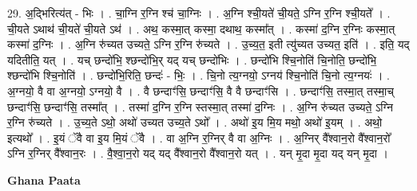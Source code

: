 \documentclass[17pt]{extarticle}
\begin{document}
29. अ॒द्भिरित्य॑त् - भिः । . चा॒ग्नि र॒ग्नि श्च॑ चा॒ग्निः । . अ॒ग्नि श्ची॒यते॑ ची॒यते॒ ऽग्नि र॒ग्नि श्ची॒यते᳚ । . ची॒यते ऽथाथ॑ ची॒यते॑ ची॒यते ऽथ॑ । . अथ॒ कस्मा॒त् कस्मा॒ दथाथ॒ कस्मा᳚त् । . कस्मा॑ द॒ग्नि र॒ग्निः कस्मा॒त् कस्मा॑ द॒ग्निः । . अ॒ग्नि रु॑च्यत उच्यते॒ ऽग्नि र॒ग्नि रु॑च्यते । . उ॒च्य॒त॒ इती त्यु॑च्यत उच्यत॒ इति॑ । . इति॒ यद् यदितीति॒ यत् । . यच् छन्दो॑भि॒ श्छन्दो॑भि॒र् यद् यच् छन्दो॑भिः । . छन्दो॑भि श्चि॒नोति॑ चि॒नोति॒ छन्दो॑भि॒ श्छन्दो॑भि श्चि॒नोति॑ । . छन्दो॑भि॒रिति॒ छन्दः॑ - भिः॒ । . चि॒नो त्य॒ग्नयो॒ ऽग्नय॑ श्चि॒नोति॑ चि॒नो त्य॒ग्नयः॑ । . अ॒ग्नयो॒ वै वा अ॒ग्नयो॒ ऽग्नयो॒ वै । . वै छन्दाꣳ॑सि॒ छन्दाꣳ॑सि॒ वै वै छन्दाꣳ॑सि । . छन्दाꣳ॑सि॒ तस्मा॒त् तस्मा॒च् छन्दाꣳ॑सि॒ छन्दाꣳ॑सि॒ तस्मा᳚त् । . तस्मा॑ द॒ग्नि र॒ग्नि स्तस्मा॒त् तस्मा॑ द॒ग्निः । . अ॒ग्नि रु॑च्यत उच्यते॒ ऽग्नि र॒ग्नि रु॑च्यते । . उ॒च्य॒ते ऽथो॒ अथो॑ उच्यत उच्य॒ते ऽथो᳚ । . अथो॑ इ॒य मि॒य मथो॒ अथो॑ इ॒यम् । . अथो॒ इत्यथो᳚ । . इ॒यं ॅवै वा इ॒य मि॒यं ॅवै । . वा अ॒ग्नि र॒ग्निर् वै वा अ॒ग्निः । . अ॒ग्निर् वै᳚श्वान॒रो वै᳚श्वान॒रो᳚ ऽग्नि र॒ग्निर् वै᳚श्वान॒रः । . वै॒श्वा॒न॒रो यद् यद् वै᳚श्वान॒रो वै᳚श्वान॒रो यत् । . यन् मृ॒दा मृ॒दा यद् यन् मृ॒दा । \newline

\textbf{Ghana Paata } \newline
\end{document}
